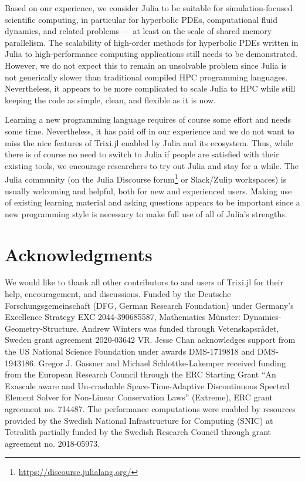 \documentclass{juliacon}
\newcommand{\trixi}{Trixi.jl\xspace}
\begin{document}
Based on our experience, we consider Julia to be suitable for simulation-focused
scientific computing, in particular for hyperbolic PDEs, computational fluid
dynamics, and related problems --- at least on the scale of shared memory
parallelism. The scalability of high-order methods for hyperbolic PDEs written
in Julia to high-performance computing applications still needs to be demonstrated.
However, we do not expect this to remain an unsolvable problem since Julia is not
generically slower than traditional compiled HPC programming languages. Nevertheless,
it appears to be more complicated to scale Julia to HPC while still keeping the
code as simple, clean, and flexible as it is now.

Learning a new programming language requires of course some effort and needs some
time. Nevertheless, it has paid off in our experience and we do not want to miss the
nice features of \trixi enabled by Julia and its ecosystem. Thus, while there is
of course no need to switch to Julia if people are satisfied with their existing
tools, we encourage researchers to try out Julia and stay for a while. The Julia
community (on the Julia Discourse forum\footnote{\url{https://discourse.julialang.org/}}
or Slack/Zulip workspaces) is usually welcoming and helpful, both for new and
experienced users. Making use of existing learning material and asking questions
appears to be important since a new programming style is necessary to make full
use of all of Julia's strengths.



\section*{Acknowledgments}

We would like to thank all other contributors to and users of \trixi for their
help, encouragement, and discussions.
Funded by the Deutsche Forschungsgemeinschaft (DFG, German Research Foundation)
under Germany's Excellence Strategy EXC 2044-390685587, Mathematics Münster:
Dynamics-Geometry-Structure.
Andrew Winters was funded through Vetenskapsr{\aa}det, Sweden grant
agreement 2020-03642 VR.
Jesse Chan acknowledges support from the US National Science Foundation under
awards DMS-1719818 and DMS-1943186.
Gregor J. Gassner and Michael Schlottke-Lakemper received funding from the European Research Council through the ERC Starting Grant “An Exascale aware and Un-crashable Space-Time-Adaptive Discontinuous Spectral Element Solver for Non-Linear Conservation Laws” (Extreme), ERC grant agreement no. 714487.
The performance computations were enabled by resources provided by the Swedish National
Infrastructure for Computing (SNIC) at Tetralith partially funded by the Swedish
Research Council through grant agreement no. 2018-05973.
\end{document}
